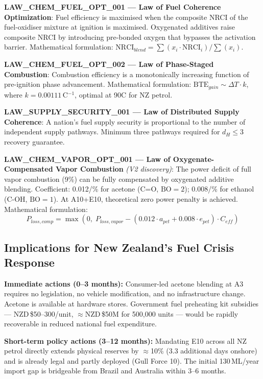 \documentclass[12pt,a4paper]{article}
\begin{document}
\textbf{LAW\_CHEM\_FUEL\_OPT\_001 --- Law of Fuel Coherence Optimization}: Fuel
efficiency is maximised when the composite NRCI of the fuel-oxidiser mixture at
ignition is maximised. Oxygenated additives raise composite NRCI by introducing
pre-bonded oxygen that bypasses the activation barrier. Mathematical formulation:
$\text{NRCI}_{blend} = \sum(x_i \cdot \text{NRCI}_i) / \sum(x_i)$.

\textbf{LAW\_CHEM\_FUEL\_OPT\_002 --- Law of Phase-Staged Combustion}: Combustion
efficiency is a monotonically increasing function of pre-ignition phase advancement.
Mathematical formulation: $\text{BTE}_{gain} \sim \Delta T \cdot k$, where
$k = 0.00111$\,\textdegree C$^{-1}$, optimal at 90\textdegree C for NZ petrol.

\textbf{LAW\_SUPPLY\_SECURITY\_001 --- Law of Distributed Supply Coherence}: A
nation's fuel supply security is proportional to the number of independent supply
pathways. Minimum three pathways required for $d_H \leq 3$ recovery guarantee.

\textbf{LAW\_CHEM\_VAPOR\_OPT\_001 --- Law of Oxygenate-Compensated Vapor Combustion}
\textit{(V2 discovery)}: The power deficit of full vapor combustion (9\%) can be fully
compensated by oxygenated additive blending. Coefficient: 0.012/\% for acetone
(C=O, $\text{BO}=2$); 0.008/\% for ethanol (C-OH, $\text{BO}=1$). At A10+E10,
theoretical zero power penalty is achieved. Mathematical formulation:
\[
P_{loss,comp} = \max\!\left(0,\; P_{loss,vapor} - (0.012 \cdot a_{pct} + 0.008 \cdot e_{pct}) \cdot C_{eff}\right)
\]

\subsection{Implications for New Zealand's Fuel Crisis Response}

\textbf{Immediate actions (0--3 months):} Consumer-led acetone blending at A3
requires no legislation, no vehicle modification, and no infrastructure change.
Acetone is available at hardware stores. Government fuel preheating kit subsidies ---
NZD\,\$50--300/unit, $\approx$NZD\,\$50M for 500,000 units --- would be rapidly
recoverable in reduced national fuel expenditure.

\textbf{Short-term policy actions (3--12 months):} Mandating E10 across all NZ petrol
directly extends physical reserves by $\approx$10\% (3.3 additional days onshore) and
is already legal and partly deployed (Gull Force 10). The initial 130\,ML/year import
gap is bridgeable from Brazil and Australia within 3--6 months.
\end{document}
